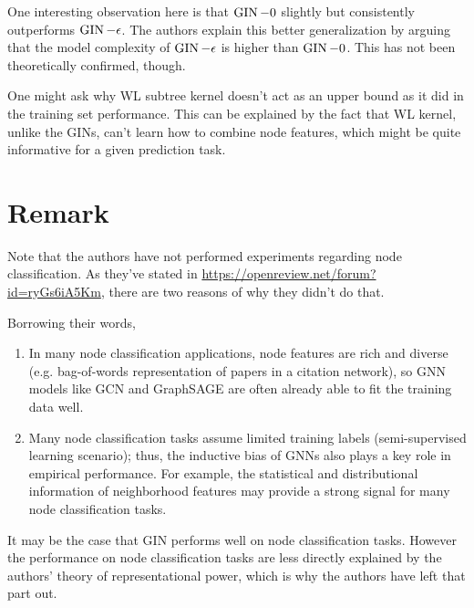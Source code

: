 One interesting observation here is that $\operatorname{GIN}-0$ slightly but consistently outperforms $\operatorname{GIN}-\epsilon$. The authors explain this better generalization by arguing that the model complexity of $\operatorname{GIN}-\epsilon$ is higher than $\operatorname{GIN}-0$. This has not been theoretically confirmed, though.

One might ask why WL subtree kernel doesn't act as an upper bound as it did in the training set performance. This can be explained by the fact that WL kernel, unlike the GINs, can't learn how to combine node features, which might be quite informative for a given prediction task.


\section{Remark}

Note that the authors have not performed experiments regarding node classification. As they've stated in \url{https://openreview.net/forum?id=ryGs6iA5Km}, there are two reasons of why they didn't do that.

Borrowing their words,

\begin{enumerate}
\item In many node classification applications, node features are rich and diverse (e.g. bag-of-words representation of papers in a citation network), so GNN models like GCN and GraphSAGE are often already able to fit the training data well.

\item Many node classification tasks assume limited training labels (semi-supervised learning scenario); thus, the inductive bias of GNNs also plays a key role in empirical performance. For example, the statistical and distributional information of neighborhood features may provide a strong signal for many node classification tasks.
\end{enumerate}

It may be the case that GIN performs well on node classification tasks. However the performance on node classification tasks are less directly explained by the authors' theory of representational power, which is why the authors have left that part out.
